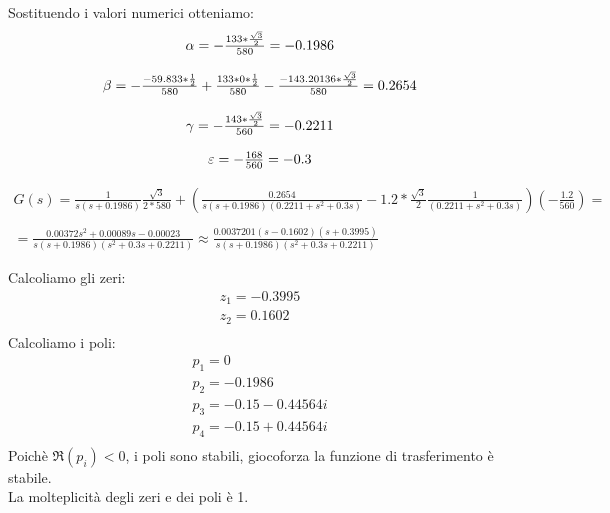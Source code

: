 Sostituendo i valori numerici otteniamo:
\begin{displaymath}
\begin{array}{cc}
\alpha=-\frac{133*\frac{\sqrt{3}}{2}}{580}=\text{\ensuremath{-0.1986}} \\ \\
\beta=-\frac{-59.833*\frac{1}{2}}{580}+\frac{133*0*\frac{1}{2}}{580}-\frac{-143.20136*\frac{\sqrt{3}}{2}}{580}=0.2654 \\ \\
\gamma=-\frac{143*\frac{\sqrt{3}}{2}}{560}=\text{\ensuremath{-0.2211}} \\ \\
\varepsilon=-\frac{168}{560}=-0.3 \\
\end{array}
\end{displaymath}
\begin{small}
\begin{displaymath}
\begin{array}{cc}
G(s)=\frac{1}{s(s+0.1986)}\frac{\sqrt{3}}{2*580}+(\frac{0.2654}{s(s+0.1986)(0.2211+s^{2}+0.3s)}-1.2*\frac{\sqrt{3}}{2}\frac{1}{(0.2211+s^{2}+0.3s)})(-\frac{1.2}{560}) = \\ \\ 
=\frac{0.00372s^{2}+0.00089s-0.00023}{s\left(s+0.1986\right)\left(s^{2}+0.3s+0.2211\right)}
\approx\frac{0.0037201\left(s-0.1602\right)\left(s+0.3995\right)}{s\left(s+0.1986\right)\left(s^{2}+0.3s+0.2211\right)} 
\end{array}
\end{displaymath}
\end{small}
Calcoliamo gli zeri:
\begin{displaymath}
\begin{array}{cc}
z_1 = -0.3995 \\
z_2 = 0.1602  \\
\end{array}
\end{displaymath}
Calcoliamo i poli:
\begin{displaymath}
\begin{array}{cc}
p_1 = 0 \\ 
p_2 = -0.1986  \\
p_3 = -0.15 - 0.44564i \\
p_4 = -0.15 + 0.44564i \\
\end{array}
\end{displaymath}
Poichè $\Re(p_i)<0$, i poli sono stabili, giocoforza la funzione di trasferimento è stabile. \\
La molteplicità degli zeri e dei poli è 1.